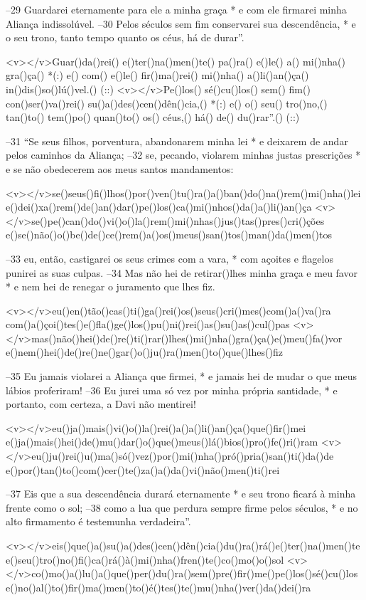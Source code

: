 –29 Guardarei eternamente para ele a minha graça *
e com ele firmarei minha Aliança indissolúvel.
–30 Pelos séculos sem fim conservarei sua descendência, *
e o seu trono, tanto tempo quanto os céus, há de durar”.

<v></v>Guar()da()rei() e()ter()na()men()te() pa()ra() e()le() a() mi()nha() gra()ça() *(:)
e() com() e()le() fir()ma()rei() mi()nha() a()li()an()ça() in()dis()so()lú()vel.() (::)
<v></v>Pe()los() sé()cu()los() sem() fim() con()ser()va()rei() su()a()des()cen()dên()cia,() *(:)
e() o() seu() tro()no,() tan()to() tem()po() quan()to() os() céus,() há() de() du()rar''.() (::)

–31 “Se seus filhos, porventura, abandonarem minha lei *
e deixarem de andar pelos caminhos da Aliança;
–32 se, pecando, violarem minhas justas prescrições *
e se não obedecerem aos meus santos mandamentos:

<v></v>se()seus()fi()lhos()por()ven()tu()ra()a()ban()do()na()rem()mi()nha()lei
e()dei()xa()rem()de()an()dar()pe()los()ca()mi()nhos()da()a()li()an()ça
<v></v>se()pe()can()do()vi()o()la()rem()mi()nhas()jus()tas()pres()cri()ções
e()se()não()o()be()de()ce()rem()a()os()meus()san()tos()man()da()men()tos

–33 eu, então, castigarei os seus crimes com a vara, *
com açoites e flagelos punirei as suas culpas.
–34 Mas não hei de retirar()lhes minha graça e meu favor *
e nem hei de renegar o juramento que lhes fiz.

<v></v>eu()en()tão()cas()ti()ga()rei()os()seus()cri()mes()com()a()va()ra
com()a()çoi()tes()e()fla()ge()los()pu()ni()rei()as()su()as()cul()pas
<v></v>mas()não()hei()de()re()ti()rar()lhes()mi()nha()gra()ça()e()meu()fa()vor
e()nem()hei()de()re()ne()gar()o()ju()ra()men()to()que()lhes()fiz

–35 Eu jamais violarei a Aliança que firmei, *
e jamais hei de mudar o que meus lábios proferiram!
–36 Eu jurei uma só vez por minha própria santidade, *
e portanto, com certeza, a Davi não mentirei!

<v></v>eu()ja()mais()vi()o()la()rei()a()a()li()an()ça()que()fir()mei
e()ja()mais()hei()de()mu()dar()o()que()meus()lá()bios()pro()fe()ri()ram
<v></v>eu()ju()rei()u()ma()só()vez()por()mi()nha()pró()pria()san()ti()da()de
e()por()tan()to()com()cer()te()za()a()da()vi()não()men()ti()rei

–37 Eis que a sua descendência durará eternamente *
e seu trono ficará à minha frente como o sol;
–38 como a lua que perdura sempre firme pelos séculos, *
e no alto firmamento é testemunha verdadeira”.

<v></v>eis()que()a()su()a()des()cen()dên()cia()du()ra()rá()e()ter()na()men()te
e()seu()tro()no()fi()ca()rá()à()mi()nha()fren()te()co()mo()o()sol
<v></v>co()mo()a()lu()a()que()per()du()ra()sem()pre()fir()me()pe()los()sé()cu()los
e()no()al()to()fir()ma()men()to()é()tes()te()mu()nha()ver()da()dei()ra